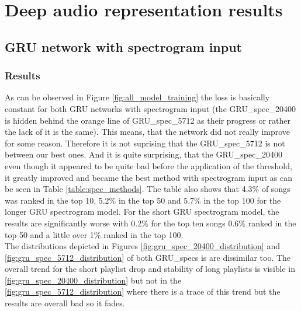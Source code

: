 \section{Deep audio representation results}

\subsection{GRU network with spectrogram input}

\subsubsection{Results}
As can be observed in Figure \ref{fig:all_model_training} the loss is basically constant for both GRU networks with spectrogram input (the GRU\_spec\_20400 is hidden behind the orange line of GRU\_spec\_5712 as their progress or rather the lack of it is the same). This means, that the network did not really improve for some reason. Therefore it is not suprising that the GRU\_spec\_5712 is not between our best ones. And it is quite surprising, that the GRU\_spec\_20400 even though it appeared to be quite bad before the application of the threshold, it greatly improved and became the best method with spectrogram input as can be seen in Table \ref{table:spec_methods}. The table also shows that 4.3\% of songs was ranked in the top 10, 5.2\% in the top 50 and 5.7\% in the top 100 for the longer GRU spectrogram model. For the short GRU spectrogram model, the results are significantly worse with 0.2\% for the top ten songs 0.6\% ranked in the top 50 and a little over 1\% ranked in the top 100. \\
The distributions depicted in Figures \ref{fig:gru_spec_20400_distribution} and \ref{fig:gru_spec_5712_distribution} of both GRU\_specs is are dissimilar too. The overall trend for the short playlist drop and stability of long playlists is visible in \ref{fig:gru_spec_20400_distribution} but not in the \ref{fig:gru_spec_5712_distribution} where there is a trace of this trend but the results are overall bad so it fades. 

